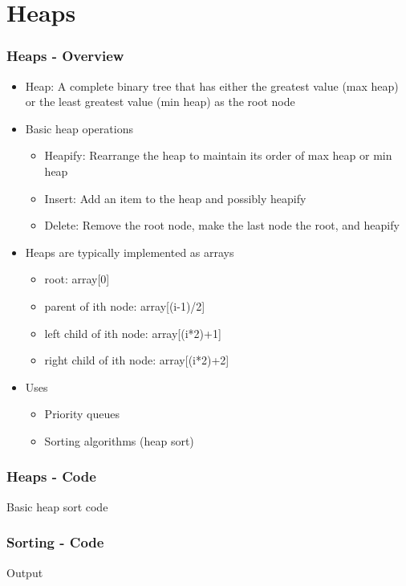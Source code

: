 \section{Heaps}
\begin{frame}\frametitle{Heaps - Overview}
\begin{itemize}
\item Heap: A complete binary tree that has either the greatest value (max heap) or the least greatest value (min heap) as the root node
\item Basic heap operations
	\begin{itemize}
	\item Heapify: Rearrange the heap to maintain its order of max heap or min heap
	\item Insert: Add an item to the heap and possibly heapify
	\item Delete: Remove the root node, make the last node the root, and heapify
	\end{itemize}
\item Heaps are typically implemented as arrays
	\begin{itemize}
	\item root: array[0]
	\item parent of ith node: array[(i-1)/2]
	\item left child of ith node: array[(i*2)+1]
	\item right child of ith node: array[(i*2)+2]
	\end{itemize}
\item Uses
	\begin{itemize}
	\item Priority queues
	\item Sorting algorithms (heap sort)
	\end{itemize}
\end{itemize}
\end{frame}

\begin{frame}\frametitle{Heaps - Code}
Basic heap sort code

\end{frame}

\begin{frame}\frametitle{Sorting - Code}
Output

\end{frame}

